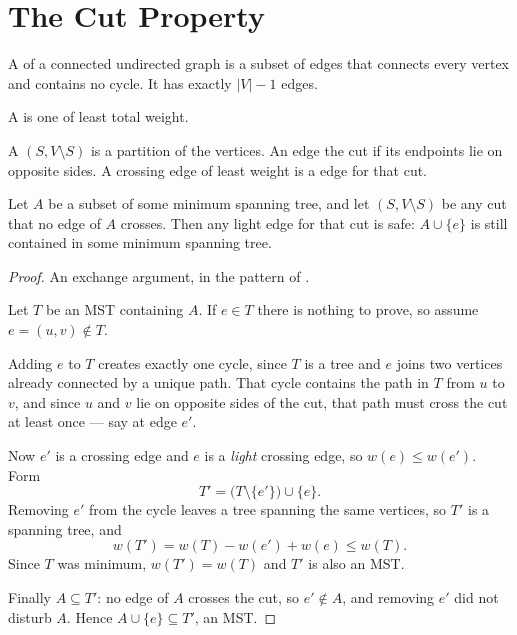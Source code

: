 \section{The Cut Property}

\begin{definitionbox}
A  of a connected undirected graph is a subset of edges
that connects every vertex and contains no cycle. It has exactly $|V|-1$ edges.

\smallskip
A  is one of least total weight.
\end{definitionbox}

\begin{definitionbox}
A  $(S, V \setminus S)$ is a partition of the vertices. An edge
 the cut if its endpoints lie on opposite sides. A crossing edge
of least weight is a  edge for that cut.
\end{definitionbox}

\begin{theorem}\label{thm:cut}
Let $A$ be a subset of some minimum spanning tree, and let $(S, V\setminus S)$
be any cut that no edge of $A$ crosses. Then any light edge for that cut is
safe: $A \cup \{e\}$ is still contained in some minimum spanning tree.
\end{theorem}

\begin{proof}
An exchange argument, in the pattern of .

\smallskip
Let $T$ be an MST containing $A$. If $e \in T$ there is nothing to prove, so
assume $e = (u,v) \notin T$.

\smallskip
Adding $e$ to $T$ creates exactly one cycle, since $T$ is a tree and $e$ joins
two vertices already connected by a unique path. That cycle contains the path
in $T$ from $u$ to $v$, and since $u$ and $v$ lie on opposite sides of the cut,
that path must cross the cut at least once --- say at edge $e'$.

\smallskip
Now $e'$ is a crossing edge and $e$ is a \emph{light} crossing edge, so
$w(e) \le w(e')$. Form
\[ T' = \bigl(T \setminus \{e'\}\bigr) \cup \{e\}. \]
Removing $e'$ from the cycle leaves a tree spanning the same vertices, so $T'$
is a spanning tree, and
\[ w(T') = w(T) - w(e') + w(e) \le w(T). \]
Since $T$ was minimum, $w(T') = w(T)$ and $T'$ is also an MST.

\smallskip
Finally $A \subseteq T'$: no edge of $A$ crosses the cut, so $e' \notin A$, and
removing $e'$ did not disturb $A$. Hence $A \cup \{e\} \subseteq T'$, an MST.
\end{proof}

